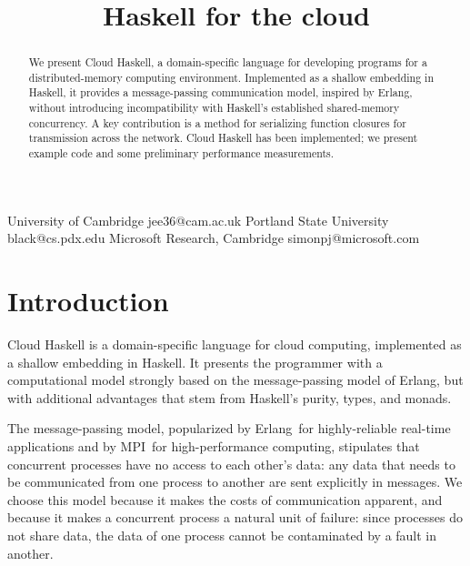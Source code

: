 \documentclass[preprint]{sigplanconf}
\begin{document}
\title{Haskell for the cloud}
\subtitle{}

           {University of Cambridge}
           {jee36@cam.ac.uk}
           {Portland State University}
           {black@cs.pdx.edu}
           {Microsoft Research, Cambridge}
           {simonpj@microsoft.com}

\maketitle
\begin{abstract}
We present Cloud Haskell, a domain-specific language for developing programs for a distributed-memory computing environment. Implemented as a shallow embedding in Haskell, it provides a message-passing communication model, inspired by Erlang, without introducing incompatibility with Haskell's established shared-memory concurrency. A key contribution is a method for serializing function closures for transmission across the network.
Cloud Haskell has been implemented; we present example code and some preliminary performance measurements.

\end{abstract}


%
%
%
%
\section{Introduction}

Cloud Haskell is a domain-specific language for cloud computing, implemented as a shallow embedding in Haskell.
It presents the programmer with a computational model strongly based on the message-passing model of  Erlang, but with additional advantages that stem from Haskell's purity, types, and monads.  

The message-passing model, popularized by \mbox{Erlang}\,\cite{Erlang93} for highly-reliable real-time applications and by MPI\,\cite{mpi99} for high-performance computing, stipulates that concurrent processes have no access to each other's data: any data that needs to be communicated from one process to another are sent explicitly in messages.  
We choose this model because it makes the costs of communication apparent, and because it makes a concurrent process a natural unit of failure: since processes do not share data, the data of one process cannot be contaminated by a fault in another.
\end{document}
